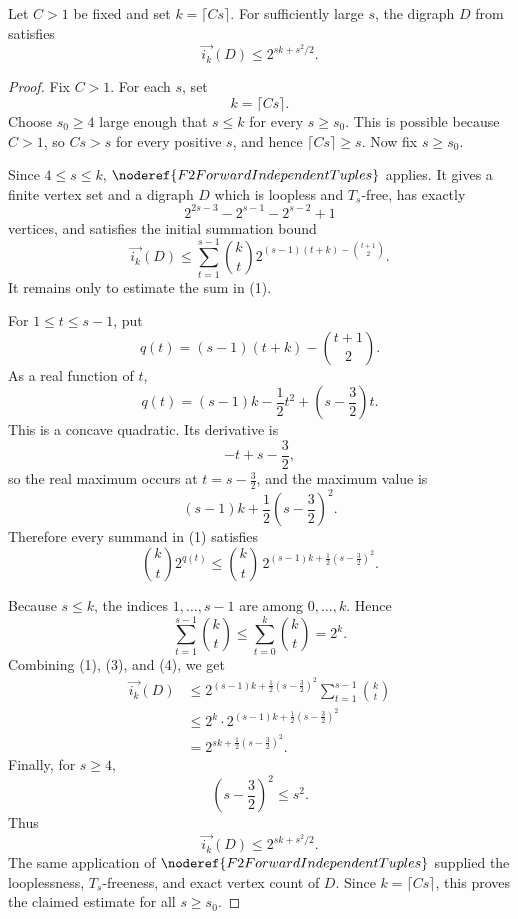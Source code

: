 \begin{lemma}
Let \(C>1\) be fixed and set \(k=\lceil Cs\rceil\). For sufficiently large \(s\), the digraph \(D\) from  satisfies
\[
  \overrightarrow{i_k}(D)\le 2^{sk+s^2/2}.
\]
\end{lemma}
\begin{proof}
Fix \(C>1\). For each \(s\), set
\[
  k=\lceil Cs\rceil.
\]
Choose \(s_0\ge4\) large enough that \(s\le k\) for every \(s\ge s_0\). This is possible because \(C>1\), so \(Cs>s\) for every positive \(s\), and hence \(\lceil Cs\rceil\ge s\). Now fix \(s\ge s_0\).

Since \(4\le s\le k\), \(\noderef{F2ForwardIndependentTuples}\) applies. It gives a finite vertex set and a digraph \(D\) which is loopless and \(T_s\)-free, has exactly
\[
  2^{2s-3}-2^{s-1}-2^{s-2}+1
\]
vertices, and satisfies the initial summation bound
\[
  \overrightarrow{i_k}(D)\le
  \sum_{t=1}^{s-1}
    \binom{k}{t}2^{(s-1)(t+k)-\binom{t+1}{2}}. \tag{1}
\]
It remains only to estimate the sum in (1).

For \(1\le t\le s-1\), put
\[
  q(t)=(s-1)(t+k)-\binom{t+1}{2}.
\]
As a real function of \(t\),
\[
  q(t)=(s-1)k-\frac12t^2+\left(s-\frac32\right)t.
\]
This is a concave quadratic. Its derivative is
\[
  -t+s-\frac32,
\]
so the real maximum occurs at \(t=s-\frac32\), and the maximum value is
\[
  (s-1)k+\frac12\left(s-\frac32\right)^2. \tag{2}
\]
Therefore every summand in (1) satisfies
\[
  \binom{k}{t}2^{q(t)}
  \le
  \binom{k}{t}\,
  2^{(s-1)k+\frac12(s-\frac32)^2}. \tag{3}
\]

Because \(s\le k\), the indices \(1,\ldots,s-1\) are among \(0,\ldots,k\). Hence
\[
  \sum_{t=1}^{s-1}\binom{k}{t}\le
  \sum_{t=0}^{k}\binom{k}{t}=2^k. \tag{4}
\]
Combining (1), (3), and (4), we get
\[
\begin{aligned}
  \overrightarrow{i_k}(D)
  &\le
  2^{(s-1)k+\frac12(s-\frac32)^2}
  \sum_{t=1}^{s-1}\binom{k}{t}  \\
  &\le
  2^k\cdot
  2^{(s-1)k+\frac12(s-\frac32)^2}  \\
  &=
  2^{sk+\frac12(s-\frac32)^2}.
\end{aligned}
\]
Finally, for \(s\ge4\),
\[
  \left(s-\frac32\right)^2\le s^2.
\]
Thus
\[
  \overrightarrow{i_k}(D)
  \le 2^{sk+s^2/2}.
\]
The same application of \(\noderef{F2ForwardIndependentTuples}\) supplied the looplessness, \(T_s\)-freeness, and exact vertex count of \(D\). Since \(k=\lceil Cs\rceil\), this proves the claimed estimate for all \(s\ge s_0\).
\end{proof}

